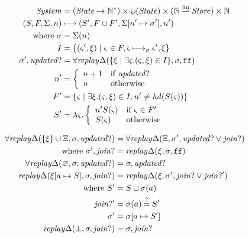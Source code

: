 \documentclass{llncs}
\newcommand{\finto}{\mathbin{\overset{\text{fin}}{\rightharpoonup}}}
\newcommand{\setof}[1]{\{ #1 \}}
\begin{document}
\begin{align*}
\System &= (\State \to {\mathbb N}^*) \times \wp(\State) \times ({\mathbb N} \finto \Store) \times {\mathbb N} \\
(S,F,\Sigma,n) &\machstep (S', F \cup F', \Sigma[n' \mapsto \msto'],n') \\
 \text{ where }
 \msto &= \Sigma(n) \\
  I &= \setof{ \ttuple{\mstate'}{\msdiff} \mid \mstate \in F, \mstate \machstep_\msto \mstate', \msdiff} \\
  \msto',\updatedp &=
     \replaychangeall(\setof{\msdiff \mid \exists \mstate. (\mstate, \msdiff) \in I}, \msto,\sfalse) \\
  n' &= \left\{\begin{array}{ll}
                n + 1 & \text{if } \updatedp \\
                n & \text{otherwise}
               \end{array}\right. \\
  F' &= \setof{\mstate \mid \exists \msdiff. (\mstate,\msdiff) \in I,
                n' \neq \hd(S(\mstate))} \\
  S' &= \lambda \mstate. \left\{\begin{array}{ll}
                                 n' S(\mstate) & \text{if } \mstate \in F' \\
                                 S(\mstate) & \text{otherwise}
                                \end{array}\right.
\end{align*}

\begin{align*}
  \replaychangeall(\setof{\msdiff} \cup \Xi, \msto, \updatedp) &=
    \replaychangeall(\Xi, \msto', \updatedp \vee \joinp) \\
   \text{ where } \msto', \joinp &= \replaychange(\msdiff, \msto, \sfalse) \\
  \replaychangeall(\varnothing, \msto, \updatedp) &= \msto, \updatedp \\
  \replaychange(\msdiff[\maddr \mapsto S], \msto, \joinp) &=
   \replaychange(\msdiff, \msto', \joinp \vee \joinp') \\
  \text{ where } S' &= S \sqcup \msto(\maddr) \\
                 \joinp' &= \msto(\maddr) \deceq S' \\
                 \msto' &= \msto[\maddr \mapsto S'] \\
  \replaychange(\bot, \msto, \joinp) &= \msto, \joinp
\end{align*}
\end{document}
